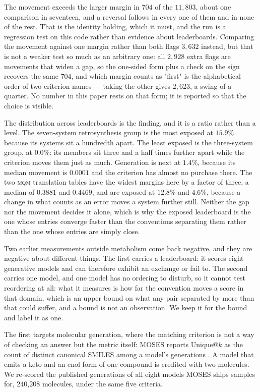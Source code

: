 The movement exceeds the larger margin in $704$ of the $11{,}803$, about one
comparison in seventeen, and a reversal follows in every one of them and in none of the rest. That is the identity
holding, which it must, and the run is a regression test on this code rather than evidence
about leaderboards. Comparing the movement against one margin rather than both
flags $3{,}632$ instead, but that is not a weaker test so much as an arbitrary one: all $2{,}928$
extra flags are movements that widen a gap, so the one-sided form plus a check on the sign recovers
the same $704$, and which margin counts as "first" is the alphabetical order of two criterion names
--- taking the other gives $2{,}623$, a swing of a quarter. No number in this paper rests on that
form; it is reported so that the choice is visible.

The distribution across leaderboards is the finding, and it is a ratio rather than a level. The
seven-system retrosynthesis group is the most exposed at
$15.9\%$
because its systems sit a hundredth apart. The least exposed is the three-system group, at
$0.0\%$: its members sit three and a half times further apart while the criterion moves them
just as much. Generation is next at $1.4\%$, because its median movement is
$0.0001$ and the criterion has almost no purchase there. The two \textsc{mqm} translation
tables have the widest margins here by a factor of three, a median of $0.3881$ and $0.4469$,
and are exposed at $12.8\%$ and $4.6\%$, because a change in what
counts as an error moves a system further still. Neither the gap nor the
movement decides it alone, which is why the exposed leaderboard is the one whose entries converge
faster than the conventions separating them rather than the one whose entries are simply close.

Two earlier measurements outside metabolism come back negative, and they are negative about
different things. The first carries a leaderboard: it scores eight generative models and can
therefore exhibit an exchange or fail to. The second carries one model, and one model has no
ordering to disturb, so it cannot test reordering at all: what it measures is how far the
convention moves a score in that domain, which is an upper bound on what any pair separated by more
than that could suffer, and a bound is not an observation. We keep it for the bound and label it as
one.

The first targets molecular generation, where the matching criterion is not a way of checking an
answer but the metric itself: MOSES reports Unique@$k$ as the count of distinct canonical SMILES
among a model's generations \citep{Polykovskiy_2020}. A model that emits a keto and an enol form of
one compound is credited with two molecules. We re-scored the published generations of all eight
models MOSES ships samples for, 240{,}208 molecules, under the same five criteria.

